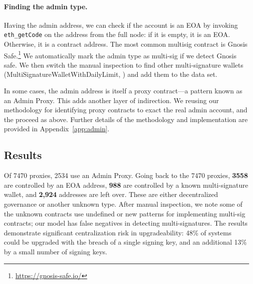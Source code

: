 \paragraph{Finding the admin type.} Having the admin address, we can check if the account is an EOA by invoking \texttt{eth\_getCode} on the address from the full node: if it is empty, it is an EOA. Otherwise, it is a contract address. The most common multisig contract is Gnosis Safe.\footnote{\url{https://gnosis-safe.io/}} We automatically mark the admin type as multi-sig if we detect Gnosis safe. We then switch the manual inspection to find other multi-signature wallets (\eg MultiSignatureWalletWithDailyLimit, \etc) and add them to the data set. 

In some cases, the admin address is itself a proxy contract---a pattern known as an Admin Proxy. This adds another layer of indirection. We reusing our methodology for identifying proxy contracts to exact the real admin account, and the proceed as above. Further details of the methodology and implementation are provided in Appendix~\ref{app:admin}.

\subsection{Results}

Of 7470 proxies, 2534 use an Admin Proxy. Going back to the 7470 proxies, \textbf{3558} are controlled by an EOA address, \textbf{988} are controlled by a known multi-signature wallet, and \textbf{2,924} addresses are left over. These are either decentralized governance or another unknown type. After manual inspection, we note some of the unknown contracts use undefined or new patterns for implementing multi-sig contracts; our model has false negatives in detecting multi-signatures. The results demonstrate significant centralization risk in upgradeability: 48\% of systems could be upgraded with the breach of a single signing key, and an additional 13\% by a small number of signing keys.


